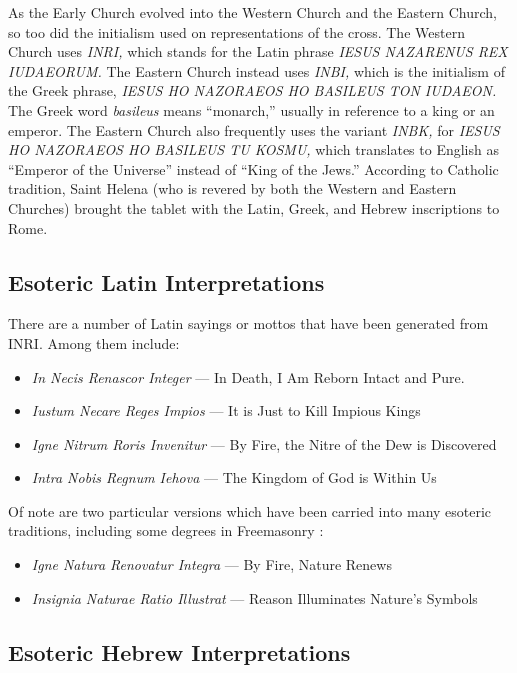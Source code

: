 \documentclass[letterpaper,11pt]{article}
\begin{document}
	As the Early Church evolved into the Western Church and the Eastern Church, so too did the initialism used on representations of the cross. The Western Church uses \emph{INRI,} which stands for the Latin phrase \emph{IESUS NAZARENUS REX IUDAEORUM.} The Eastern Church instead uses \emph{INBI,} which is the initialism of the Greek phrase, \emph{IESUS HO NAZORAEOS HO BASILEUS TON IUDAEON.} \cite{doornbos} The Greek word \emph{basileus} means ``monarch,'' usually in reference to a king or an emperor. \cite{doornbos} The Eastern Church also frequently uses the variant \emph{INBK,} for \emph{IESUS HO NAZORAEOS HO BASILEUS TU KOSMU,} which translates to English as ``Emperor of the Universe'' instead of ``King of the Jews.'' According to Catholic tradition, Saint Helena (who is revered by both the Western and Eastern Churches) brought the tablet with the Latin, Greek, and Hebrew inscriptions to Rome. \cite{weiss}
			
	\subsection*{Esoteric Latin Interpretations}
				
	There are a number of Latin sayings or mottos that have been generated from INRI. \cite{zeldis} Among them include:
	\begin{itemize}
		\item \emph{In Necis Renascor Integer} --- In Death, I Am Reborn Intact and Pure. 
		\item \emph{Iustum Necare Reges Impios} --- It is Just to Kill Impious Kings
		\item \emph{Igne Nitrum Roris Invenitur} --- By Fire, the Nitre of the Dew is Discovered
		\item \emph{Intra Nobis Regnum Iehova} --- The Kingdom of God is Within Us 
	\end{itemize}
	
	Of note are two particular versions which have been carried into many esoteric traditions, including some degrees in Freemasonry \cite{zeldis}:
	\begin{itemize}
		\item \emph{Igne Natura Renovatur Integra} --- By Fire, Nature Renews
		\item \emph{Insignia Naturae Ratio Illustrat} ---  Reason Illuminates Nature’s Symbols
	\end{itemize}
				
	\subsection*{Esoteric Hebrew Interpretations}
					
\end{document}
